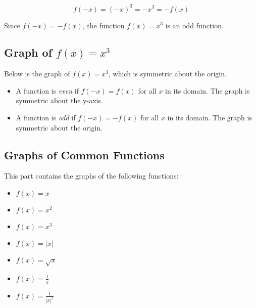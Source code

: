 \[
f(-x) = (-x)^3 = -x^3 = -f(x)
\]

Since \( f(-x) = -f(x) \), the function \( f(x) = x^3 \) is an odd function.

\subsection*{Graph of \( f(x) = x^3 \)}

Below is the graph of \( f(x) = x^3 \), which is symmetric about the origin.

\begin{center}
\end{center}


\begin{itemize}
    \item A function is \textit{even} if \( f(-x) = f(x) \) for all \( x \) in its domain. The graph is symmetric about the y-axis.
    \item A function is \textit{odd} if \( f(-x) = -f(x) \) for all \( x \) in its domain. The graph is symmetric about the origin.
\end{itemize}



\subsection{Graphs of Common Functions}

This part contains the graphs of the following functions:
\begin{itemize}
    \item \( f(x) = x \)
    \item \( f(x) = x^2 \)
    \item \( f(x) = x^3 \)
    \item \( f(x) = |x| \)
    \item \( f(x) = \sqrt{x} \)
    \item \( f(x) = \frac{1}{x} \)
    \item \( f(x) = \frac{1}{|x|^2} \)
\end{itemize}


